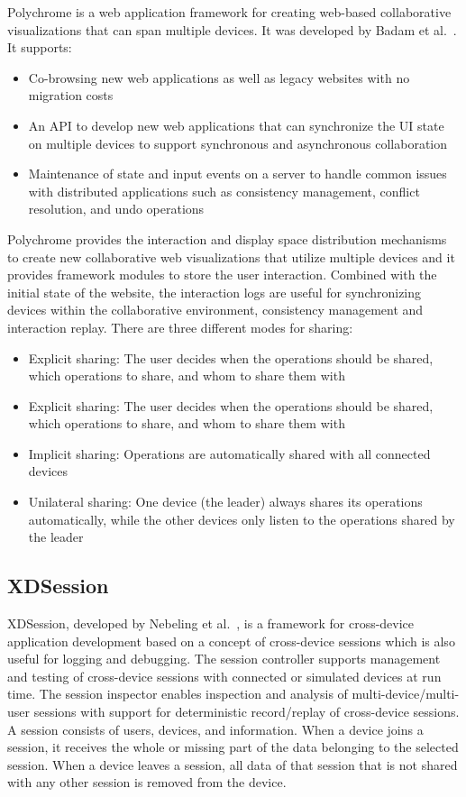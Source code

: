 Polychrome is a web application framework for creating web-based collaborative visualizations that can span multiple devices. It was developed by Badam et al.~\cite{polychrome2014}. It supports:
\begin{itemize}
	\item Co-browsing new web applications as well as legacy websites with no migration costs
	\item An API to develop new web applications that can synchronize the UI state on multiple devices to support synchronous and asynchronous collaboration
	\item Maintenance of state and input events on a server to handle common issues with distributed applications such as consistency management, conflict resolution, and undo operations
\end{itemize}
Polychrome provides the interaction and display space distribution mechanisms to create new collaborative web visualizations that utilize multiple devices and it provides framework modules to store the user interaction. Combined with the initial state of the website, the interaction logs are useful for synchronizing devices within the collaborative environment, consistency management and interaction replay. There are three different modes for sharing:
\begin{itemize}
	\item Explicit sharing: The user decides when the operations should be shared, which operations to share, and whom to share them with
	\item Explicit sharing: The user decides when the operations should be shared, which operations to share, and whom to share them with
	\item Implicit sharing: Operations are automatically shared with all connected devices
	\item Unilateral sharing: One device (the leader) always shares its operations automatically, while the other devices only listen to the operations shared by the leader
\end{itemize}

\subsection{XDSession}

XDSession, developed by Nebeling et al.~\cite{xdsession2015}, is a framework for cross-device application development based on a concept of cross-device sessions which is also useful for logging and debugging. The session controller supports management and testing of cross-device sessions with connected or simulated devices at run time. The session inspector enables inspection and analysis of multi-device/multi-user sessions with support for deterministic record/replay of cross-device sessions. A session consists of users, devices, and information. When a device joins a session, it receives the whole or missing part of the data belonging to the selected session. When a device leaves a session, all data of that session that is not shared with any other session is removed from the device.

